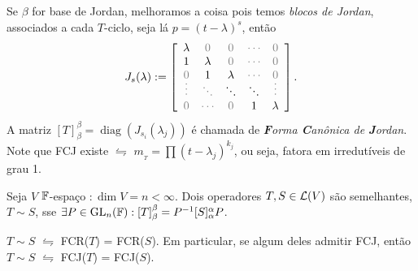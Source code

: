 \begin{note}
    Se \(\beta\) for base de Jordan, melhoramos a coisa pois temos \emph{blocos de Jordan}, associados a cada $T$-ciclo, seja lá \(p = (t - \lambda)^s\), então 
    \[ J_s(\lambda) := \left[\begin{array}{c c c c c}
        \lambda & \textcolor{gray}{0} & \textcolor{gray}{0} & \textcolor{gray}{\cdots} & \textcolor{gray}{0} \\ 
        1 & \lambda & \textcolor{gray}{0} & \textcolor{gray}{\cdots} &\textcolor{gray}{0}  \\ 
        \textcolor{gray}{0} & 1 & \lambda & \textcolor{gray}{\cdots} &\textcolor{gray}{0}  \\ 
        \textcolor{gray}{\rotatebox{90}{$\ldots$} }& \textcolor{gray}{\rotatebox{135}{$\ldots$}} & \rotatebox{135}{$\ldots$}& \rotatebox{135}{$\ldots$}& \textcolor{gray}{\rotatebox{90}{$\ldots$}}  \\ 
        \textcolor{gray}{0} & \textcolor{gray}{\cdots} & \textcolor{gray}{0} & 1& \lambda  \\ 
    \end{array}\right].\]
    A matriz \([T]_\beta^\beta = \operatorname{diag}(J_{s_i}(\lambda_j))\) é chamada de \emph{\textbf{F}orma \textbf{C}anônica de \textbf{J}ordan}. Note que FCJ existe \(\leftrightharpoons\) \(m_{_T} = \prod (t - \lambda_j)^{k_j}\), ou seja, fatora em irredutíveis de grau 1. 
\end{note}

\begin{definition}
    Seja \(V\) \(\mathbb{F}\)-espaço \(: \dim V =n <\infty\). Dois operadores \(T,S \in \mathcal{L}(V)\) são semelhantes, \(T \sim S\),  sse \(\exists P \in \operatorname{GL}_n(\mathbb{F}) :  [T]^\beta_\beta = P^{-1} [S]_\alpha^\alpha P\).  
\end{definition}

\hypertarget{thm831}{}
\begin{theorem}
    \(T\sim S\) \(\leftrightharpoons\) FCR(\(T\)) = FCR(\(S\)). Em particular, se algum deles admitir FCJ, então \(T \sim S\) \(\leftrightharpoons\) FCJ(\(T\)) = FCJ(\(S\)). 
\end{theorem}

